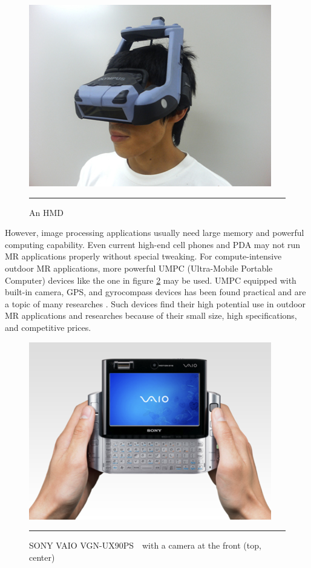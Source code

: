\begin{figure}[htbp]
	\centering
	\includegraphics{./Primitives/hmd.jpg}
	\rule{35em}{0.5pt}
	\caption[An HMD]{An HMD}
	\label{fig:HMD}
\end{figure}

However, image processing applications usually need large memory and powerful computing capability. Even current high-end cell phones and PDA may not run MR applications properly without special tweaking. For compute-intensive outdoor MR applications, more powerful UMPC (Ultra-Mobile Portable Computer) devices like the one in figure \ref{fig:VAIO} may be used. UMPC equipped with built-in camera, GPS, and gyrocompass devices has been found practical and are a topic of many researches \citep{Reference2} \citep{Reference4}. Such devices find their high potential use in outdoor MR applications and researches because of their small size, high specifications, and competitive prices.

\begin{figure}[htbp]
	\centering
	\includegraphics{./Primitives/vaio.png}
	\rule{35em}{0.5pt}
	\caption[SONY VAIO VGN-UX90PS with a camera at the front]{SONY VAIO VGN-UX90PS　with a camera at the front (top, center)}
	\label{fig:VAIO}
\end{figure}

